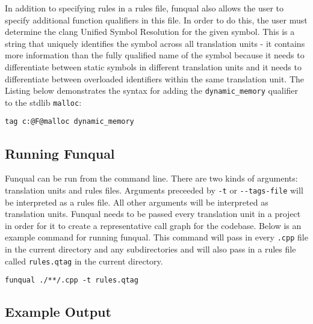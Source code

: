 In addition to specifying rules in a rules file, funqual also allows the user to specify additional function qualifiers in this file.  In order to do this, the user must determine the clang Unified Symbol Resolution for the given symbol.  This is a string that uniquely identifies the symbol across all translation units - it contains more information than the fully qualified name of the symbol because it needs to differentiate between static symbols in different translation units and it needs to differentiate between overloaded identifiers within the same translation unit.  The Listing below demonstrates the syntax for adding the \lstinline{dynamic_memory} qualifier to the stdlib \lstinline{malloc}:

\noindent\begin{minipage}[t]{\linewidth}
\begin{lstlisting}
tag c:@F@malloc dynamic_memory
\end{lstlisting}
\end{minipage}

\subsection{Running Funqual}\label{sec:operate:run}

Funqual can be run from the command line.  There are two kinds of arguments:  translation units and rules files.  Arguments preceeded by \lstinline{-t} or \lstinline{--tags-file} will be interpreted as a rules file.  All other arguments will be interpreted as translation units.  Funqual needs to be passed every translation unit in a project in order for it to create a representative call graph for the codebase.  Below is an example command for running funqual.  This command will pass in every \lstinline{.cpp} file in the current directory and any subdirectories and will also pass in a rules file called \lstinline{rules.qtag} in the current directory.

\noindent\begin{minipage}[t]{\linewidth}
\begin{lstlisting}
funqual ./**/.cpp -t rules.qtag
\end{lstlisting}
\end{minipage}

\subsection{Example Output}\label{sec:operate:output}

